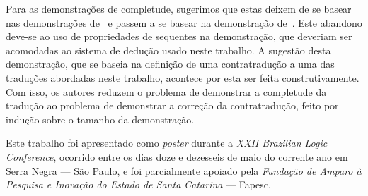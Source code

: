    \vspace{.5\baselineskip}
    Para as demonstrações de completude, sugerimos que estas deixem de se basear nas demonstrações de~\cite{Troelstra+Schwichtenberg.2000} e passem a se basear na demonstração de~\cite{Flagg+Friedman.1986}.
    Este abandono deve-se ao uso de propriedades de sequentes na demonstração, que deveriam ser acomodadas ao sistema de dedução usado neste trabalho.
    A sugestão desta demonstração, que se baseia na definição de uma contratradução a uma das traduções abordadas neste trabalho, acontece por esta ser feita construtivamente.
    Com isso, os autores reduzem o problema de demonstrar a completude da tradução ao problema de demonstrar a correção da contratradução, feito por indução sobre o tamanho da demonstração.

    \vspace{.5\baselineskip}
    Este trabalho foi apresentado como \emph{poster} durante a \emph{XXII Brazilian Logic Conference}, ocorrido entre os dias doze e dezesseis de maio do corrente ano em Serra Negra --- São Paulo, e foi parcialmente apoiado pela \emph{Fundação de Amparo à Pesquisa e Inovação do Estado de Santa Catarina} --- Fapesc.
